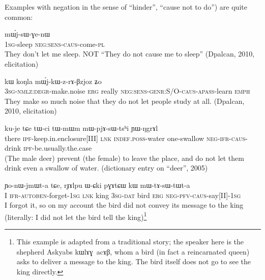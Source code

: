 \documentclass[oldfontcommands,oneside,a4paper,11pt]{article}
\newcommand{\ipa}[1]{{\phon \mbox{#1}}} %
\newcommand{\sg}{\textsc{sg}}
\newcommand{\pl}{\textsc{pl}}
\newcommand{\wav}[1]{}%
\newcommand{\apass}{\textsc{apass}}
\newcommand{\pfv}{\textsc{pfv}}
\newcommand{\auto}{\textsc{autoben}}
\newcommand{\caus}{\textsc{caus}}
\newcommand{\lnk}{\textsc{lnk}}
\newcommand{\dat}{\textsc{dat}}
\newcommand{\degr}{\textsc{degr}}
\newcommand{\erg}{\textsc{erg}}
\newcommand{\emphat}{\textsc{emph}}
\newcommand{\evd}{\textsc{ifr}}
\newcommand{\genr}{\textsc{genr}}
\newcommand{\ipf}{\textsc{ipf}}
\newcommand{\negat}{\textsc{neg}}
\newcommand{\nmlz}{\textsc{nmlz}}
\newcommand{\sens}{\textsc{sens}}
\begin{document}
Examples with negation  in the sense of ``hinder'', ``cause not to do'') are quite common:


  \begin{exe}
\ex
\gll \ipa{a-ʑɯβ} \ipa{mɯ́j-sɯ-ɣe-nɯ} \\
	1\sg{}-sleep \negat{}:\sens{}-\caus{}-come-\pl{} \\
    \glt They don't let me sleep. NOT ``They do not cause me to sleep'' (Dpalcan, 2010, elicitation)
  \end{exe} 
  
  \begin{exe}
\ex
\gll  \ipa{ɯ-tɯ-ɣɤcraŋlaŋ} 	\ipa{kɯ} 	\ipa{koŋla} 	\ipa{mɯ́j-kɯ-z-rɤ-βzjoz} 	\ipa{ʑo} \\
3\sg{}-\nmlz{}:\degr{}-make.noise \erg{} really \negat{}:\sens{}-\genr{}:S/O-\caus{}-\apass{}-learn \emphat{} \\
  \glt  They make so much noise that they do not let people study at all. (Dpalcan, 2010, elicitation)
  \end{exe}   
  
   \begin{exe}
\ex
\gll   \ipa{nɯtɕu} 	\ipa{ku-je} 	\ipa{tɕe} 	\ipa{tɯ-ci} 	\ipa{tɯ-mɯm} 	\ipa{mɯ-pjɤ-sɯ-tsʰi} 	\ipa{ɲɯ-ŋgrɤl} \\
there \ipf{}-keep.in.enclosure[III] \lnk{}  \textsc{indef.poss}-water one-swallow \negat{}-\evd{}-\caus{}-drink \ipf{}-be.usually.the.case \\
\glt (The male deer) prevent (the female) to leave the place, and do not let them drink even a swallow of water. (dictionary entry on ``deer'', 2005)
  \end{exe} 
  
\begin{exe}
\ex
\gll  \ipa{aʑo} 	\ipa{ɲo-nɯ-jmɯt-a} 	\ipa{tɕe,} 	\ipa{rɟɤlpu} 	\ipa{ɯ-ɕki} 	\ipa{pɣɤtɕɯ} 	\ipa{kɯ} 	\ipa{mɯ-tɤ-sɯ-tɯt-a}   \\
 I \textsc{ifr}-\auto{}-forget-1\sg{} \lnk{} king 3\sg{}-\dat{} bird \erg{} \negat{}-\pfv{}-\caus{}-say[II]-1\sg{} \\
  
  \glt  I forgot it, so  on my account  the bird did not convey its message to the king (literally: I did not let the bird tell the king)\footnote{This example is adapted from a traditional story; the speaker here is the shepherd Askyabs \ipa{kɯlɤɣ acɤβ}, whom a bird (in fact a reincarnated queen) asks to deliver a message to the king. The bird itself does not go to see the king directly.  } \wav{8_mWtAsWtWta2}
  \end{exe} 
\end{document}
